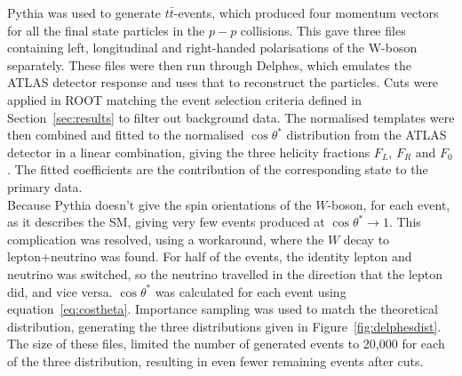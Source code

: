 \documentclass[12pt,a4paper]{article}
\numberwithin{equation}{section}
\begin{document}
Pythia was used to generate $t\bar t$-events, which produced four momentum
vectors for all the final state particles in the $p-p$ collisions. This gave
three files containing left, longitudinal and right-handed polarisations of the
W-boson separately. These files were then run through Delphes, which emulates
the ATLAS detector response and uses that to reconstruct the particles. Cuts
were applied in ROOT matching the event selection criteria defined in
Section~\ref{sec:results} to filter out background data. The normalised
templates were then combined and fitted to the normalised $\cos \theta^{*}$
distribution from the ATLAS detector in a linear combination, giving the three
helicity fractions $F_L$, $F_R$ and $F_0$. The fitted coefficients are the
contribution of the corresponding state to the primary data.\\

Because Pythia doesn't give the spin orientations of the $W$-boson, for each
event, as it describes the SM, giving very few events produced at
$\cos \theta^{*} \rightarrow 1$. This complication was resolved, using a workaround, where the
$W$ decay to lepton+neutrino was found. For half of the events, the identity
lepton and neutrino was switched, so the neutrino travelled in the direction
that the lepton did, and vice versa. $\cos \theta^{*}$ was calculated for each event
using equation~\ref{eq:costheta}. Importance sampling was used to match the
theoretical distribution, generating the three distributions given in
Figure~\ref{fig:delphesdist}. The size of these files, limited the number of
generated events to 20,000 for each of the three distribution, resulting in even
fewer remaining events after cuts.

\end{document}
